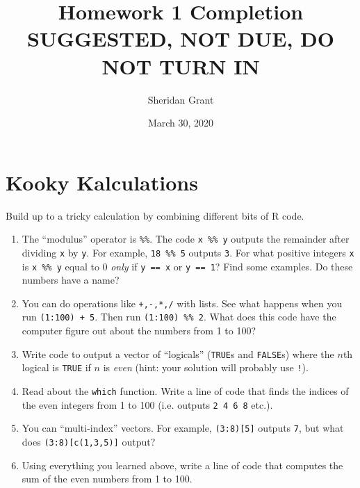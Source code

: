 \documentclass[12pt]{article}
\title{Homework 1 Completion\\\textbf{SUGGESTED, NOT DUE, DO NOT TURN IN}}
\author{Sheridan Grant}
\date{March 30, 2020}
\begin{document}
\sloppy

\maketitle

\section{Kooky Kalculations}

Build up to a tricky calculation by combining different bits of R code.
\begin{enumerate}
	\item The ``modulus'' operator is \verb|%%|. The code \verb|x %% y| outputs the remainder after dividing \verb|x| by \verb|y|. For example, \verb|18 %% 5| outputs \verb|3|. For what positive integers \verb|x| is \verb|x %% y| equal to 0 \textit{only} if \verb|y == x| or \verb|y == 1|? Find some examples. Do these numbers have a name?
	\item You can do operations like \verb|+,-,*,/| with lists. See what happens when you run \verb|(1:100) + 5|. Then run \verb|(1:100) %% 2|. What does this code have the computer figure out about the numbers from 1 to 100?
	\item Write code to output a vector of ``logicals'' (\verb|TRUE|s and \verb|FALSE|s) where the $n$th logical is \verb|TRUE| if $n$ is \textit{even} (hint: your solution will probably use \verb|!|).
	\item Read about the \verb|which| function. Write a line of code that finds the indices of the even integers from 1 to 100 (i.e. outputs \verb|2 4 6 8| etc.).
	\item You can ``multi-index'' vectors. For example, \verb|(3:8)[5]| outputs \verb|7|, but what does \verb|(3:8)[c(1,3,5)]| output?
	\item Using everything you learned above, write a line of code that computes the sum of the even numbers from 1 to 100.
\end{enumerate}
\end{document}
